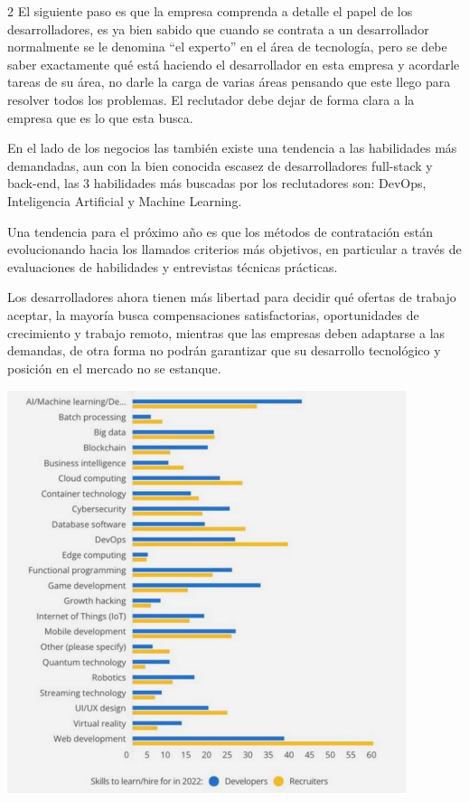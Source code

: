 \documentclass[12pt,spanish,Letterpaper,openany]{book}
\begin{document}
\begin {multicols}{2}
El siguiente paso es que la empresa comprenda a detalle el papel de los desarrolladores, es ya bien sabido que cuando se contrata a un desarrollador normalmente se le denomina ``el experto'' en el área de tecnología, pero se debe saber exactamente qué está haciendo el desarrollador en esta empresa y acordarle tareas de su área, no darle la carga de varias áreas pensando que este llego para resolver todos los problemas. El reclutador debe dejar de forma clara a la empresa que es lo que esta busca.

En el lado de los negocios las también existe una tendencia a las habilidades más demandadas, aun con la bien conocida escasez de desarrolladores full-stack y back-end, las 3 habilidades más buscadas por los reclutadores son: DevOps, Inteligencia Artificial y Machine Learning.

Una tendencia para el próximo año es que los métodos de contratación están evolucionando hacia los llamados criterios más objetivos, en particular a través de evaluaciones de habilidades y entrevistas técnicas prácticas.

Los desarrolladores ahora tienen más libertad para decidir qué ofertas de trabajo aceptar, la mayoría busca compensaciones satisfactorias, oportunidades de crecimiento y trabajo remoto, mientras que las empresas deben adaptarse a las demandas, de otra forma no podrán garantizar que su desarrollo tecnológico y posición en el mercado no se estanque.

\begin {flushleft}
\noindent\begin{minipage}[c]{\columnwidth}
\centering

\includegraphics[width=1\linewidth]{images/pareja40_image3}


\end{minipage}
\end{flushleft}
\end{multicols}
\end{document}
